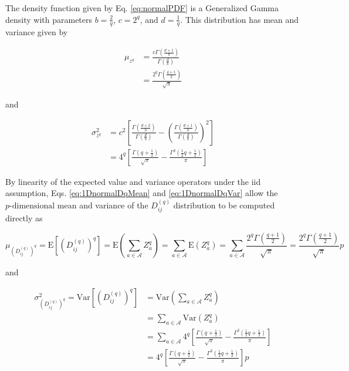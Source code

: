 \documentclass[10pt,letterpaper]{article}\usepackage[]{graphicx}\usepackage[]{color}
\begin{document}
The density function given by Eq. \ref{eq:normalPDF} is a Generalized Gamma density with parameters $b = \frac{2}{q}$, $c = 2^q$, and $d = \frac{1}{q}$. This distribution has mean and variance given by

\begin{equation}\label{eq:1DnormalDqMean}
\begin{aligned}
\mu_{z^q} &= \frac{c\Gamma\left(\frac{d+1}{b}\right)}{\Gamma\left(\frac{d}{b}\right)} \\
&= \frac{2^q \Gamma\left(\frac{q + 1}{2}\right)}{\sqrt{\pi}}
\end{aligned}
\end{equation}

\noindent and

\begin{equation}\label{eq:1DnormalDqVar}
\begin{aligned}
\sigma^2_{z^q} &= c^2\left[\frac{\Gamma\left(\frac{d+2}{b}\right)}{\Gamma\left(\frac{d}{b}\right)} - \left(\frac{\Gamma\left(\frac{d+1}{b}\right)}{\Gamma\left(\frac{d}{b}\right)}\right)^2\right] \\
&= 4^{q}\left[\frac{\Gamma\left(q + \frac{1}{2}\right)}{\sqrt{\pi}} - \frac{\Gamma^2\left(\frac{1}{2}q + \frac{1}{2}\right)}{\pi}\right]
\end{aligned}
\end{equation}

By linearity of the expected value and variance operators under the iid assumption, Eqs. \ref{eq:1DnormalDqMean} and \ref{eq:1DnormalDqVar} allow the $p\text{-dimensional}$ mean and variance of the $D^{(q)}_{ij}$ distribution to be computed directly as

\begin{equation}\label{eq:normalDqMean}
\mu_{\left(D^{(q)}_{ij}\right)^q} = \text{E}\left[\left(D^{(q)}_{ij}\right)^q\right] = \text{E}\left(\sum_{a \in \mathcal{A}} Z^q_a\right) = \sum_{a \in \mathcal{A}} \text{E}\left(Z^q_a\right) = \sum_{a \in \mathcal{A}} \frac{2^q \Gamma\left(\frac{q + 1}{2}\right)}{\sqrt{\pi}} = \frac{2^q\Gamma\left(\frac{q + 1}{2}\right)}{\sqrt{\pi}}p
\end{equation}

\noindent and

\begin{equation}\label{eq:normalVar}
\begin{split}
\sigma^2_{\left(D^{(q)}_{ij}\right)^q} = \text{Var}\left[\left(D^{(q)}_{ij}\right)^q\right] &= \text{Var}\left(\sum_{a \in \mathcal{A}} Z^q_a\right) \\
&= \sum_{a \in \mathcal{A}} \text{Var}\left(Z^q_a\right) \\
&= \sum_{a \in \mathcal{A}} 4^{q}\left[\frac{\Gamma\left(q + \frac{1}{2}\right)}{\sqrt{\pi}} - \frac{\Gamma^2\left(\frac{1}{2}q + \frac{1}{2}\right)}{\pi}\right] \\
&= 4^{q}\left[\frac{\Gamma\left(q + \frac{1}{2}\right)}{\sqrt{\pi}} - \frac{\Gamma^2\left(\frac{1}{2}q + \frac{1}{2}\right)}{\pi}\right]p
\end{split}
\end{equation}
\end{document}
